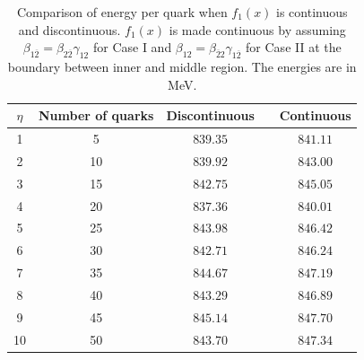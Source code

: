 \documentclass[fleqn]{article}
\begin{document}
            \begin{table}[H]
                \centering
                \caption{Comparison of energy per quark when $f_{1}(x)$ is continuous and discontinuous. $f_{1}(x)$ is made continuous by assuming $\beta_{1\overline{2}} = \beta_{2\overline{2}} \gamma_{12}$ for Case I and  $\beta_{12} = \beta_{\overline{2}2} \gamma_{1\overline{2}}$ for Case II at the boundary between inner and middle region. The energies are in MeV.}
                 \vspace{0.85cm}
                    \begin{tabular}{c c c c c }
                    \hline
                    $\eta$ & Number of quarks & Discontinuous & &Continuous \\
                    \hline
                    1 & 5  & $839.35$ & &  $841.11$     \\
                    2 & 10  & $839.92$ & &  $843.00$    \\
                    3 & 15  & $842.75$ & & $845.05$    \\
                    4 & 20  & $837.36$ & & $840.01$    \\
                    5 & 25  &  $843.98$ & & $846.42$     \\
                    6 & 30  & $842.71$ & & $846.24$    \\
                    7 & 35  & $844.67$ & & $847.19$    \\
                    8 & 40  & $843.29$ & & $846.89$     \\
                    9 & 45  & $845.14$ & & $847.70$     \\
                    10 & 50  & $843.70$ & & $847.34$     \\
                    \hline
                    \end{tabular}
            \label{tab:energy_comparison}        
            \end{table}
            
\end{document}

